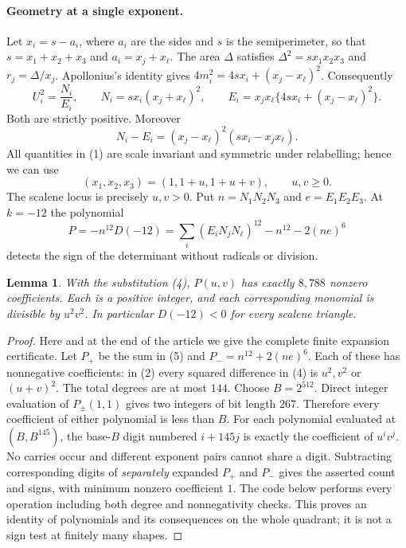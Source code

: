 \documentclass[11pt,a4paper]{article}
\numberwithin{equation}{section}
\newtheorem{lemma}[theorem]{Lemma}
\theoremstyle{definition}
\theoremstyle{remark}
\begin{document}
\paragraph{Geometry at a single exponent.}
Let $x_i=s-a_i$, where $a_i$ are the sides and $s$ is the semiperimeter, so that $s=x_1+x_2+x_3$ and $a_i=x_j+x_\ell$. The area $\Delta$ satisfies $\Delta^2=sx_1x_2x_3$ and $r_j=\Delta/x_j$. Apollonius's identity gives $4m_i^2=4sx_i+(x_j-x_\ell)^2$. Consequently
\[
 U_i^2=\frac{N_i}{E_i},\qquad
 N_i=sx_i(x_j+x_\ell)^2,\qquad
 E_i=x_jx_\ell\{4sx_i+(x_j-x_\ell)^2\}. \tag{2}
\]
Both are strictly positive. Moreover
\[
 N_i-E_i=(x_j-x_\ell)^2(sx_i-x_jx_\ell). \tag{3}
\]
All quantities in (1) are scale invariant and symmetric under relabelling; hence we can use
\[
 (x_1,x_2,x_3)=(1,1+u,1+u+v),\qquad u,v\ge0.
 \tag{4}
\]
The scalene locus is precisely $u,v>0$. Put $n=N_1N_2N_3$ and $e=E_1E_2E_3$. At $k=-12$ the polynomial
\[
 P=-n^{12}D(-12)
   =\sum_i(E_i N_jN_\ell)^{12}-n^{12}-2(ne)^6
 \tag{5}
\]
detects the sign of the determinant without radicals or division.

\begin{lemma}
With the substitution (4), $P(u,v)$ has exactly $8{,}788$ nonzero coefficients. Each is a positive integer, and each corresponding monomial is divisible by $u^2v^2$. In particular $D(-12)<0$ for every scalene triangle.
\end{lemma}
\begin{proof}
Here and at the end of the article we give the complete finite expansion certificate. Let $P_+$ be the sum in (5) and $P_-=n^{12}+2(ne)^6$. Each of these has nonnegative coefficients: in (2) every squared difference in (4) is $u^2,v^2$ or $(u+v)^2$. The total degrees are at most $144$. Choose $B=2^{512}$. Direct integer evaluation of $P_\pm(1,1)$ gives two integers of bit length $267$. Therefore every coefficient of either polynomial is less than $B$. For each polynomial evaluated at $(B,B^{145})$, the base-$B$ digit numbered $i+145j$ is exactly the coefficient of $u^iv^j$. No carries occur and different exponent pairs cannot share a digit. Subtracting corresponding digits of \emph{separately} expanded $P_+$ and $P_-$ gives the asserted count and signs, with minimum nonzero coefficient $1$. The code below performs every operation including both degree and nonnegativity checks. This proves an identity of polynomials and its consequences on the whole quadrant; it is not a sign test at finitely many shapes.
\end{proof}
\end{document}
